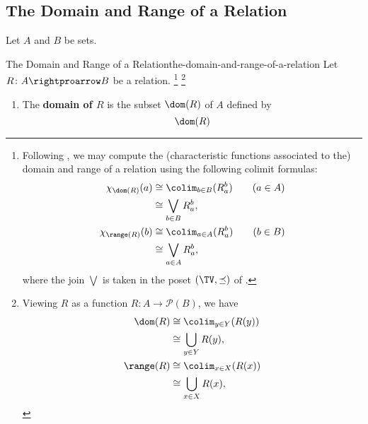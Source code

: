 \subsection{The Domain and Range of a Relation}\label{subsection-the-domain-and-range-of-a-relation}
Let $A$ and $B$ be sets.
\begin{definition}{The Domain and Range of a Relation}{the-domain-and-range-of-a-relation}%
    Let $R\colon A\rightproarrow B$ be a relation.%
    \footnote{%
        Following , we may compute the (characteristic functions associated to the) domain and range of a relation using the following colimit formulas:
        \begin{align*}
            \chi_{\dom(R)}(a)   &\cong \colim_{b\in B}(R^{b}_{a})\qquad(a\in A)\\
                                &\cong \bigvee_{b\in B}R^{b}_{a},\\
            \chi_{\range(R)}(b) &\cong \colim_{a\in A}(R^{b}_{a})\qquad(b\in B)\\
                                &\cong \bigvee_{a\in A}R^{b}_{a},
        \end{align*}
        where the join $\bigvee$ is taken in the poset $(\TV,\preceq)$ of .
    }%
    \footnote{%
        Viewing $R$ as a function $R\colon A\to\mathcal{P}(B)$, we have
        \begin{align*}
            \dom(R)   &\cong \colim_{y\in Y}(R(y))\\
                      &\cong \bigcup_{y\in Y}R(y),\\
            \range(R) &\cong \colim_{x\in X}(R(x))\\
                      &\cong \bigcup_{x\in X}R(x),
        \end{align*}
        \par\vspace*{\TCBBoxCorrection}
    }%
    \begin{enumerate}
        \item\label{the-domain-of-a-relation}The \textbf{domain of $R$} is the subset $\dom(R)$ of $A$ defined by
            \[
                \dom(R)%
\]
\end{enumerate}
\end{definition}

